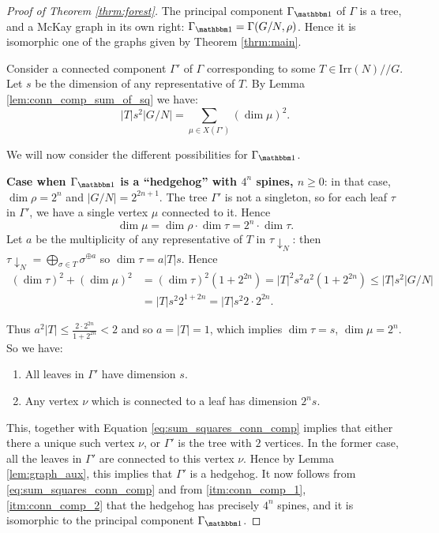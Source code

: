 \documentclass[ALCO]{cedram}
\newcommand{\triv}{{\mathbbm 1}}
\newcommand{\abs}[1]{\left|{#1}\right|}
\begin{document}
 \begin{proof}[Proof of Theorem \ref{thrm:forest}]
The principal component $\Gamma_{\triv}$ of $\Gamma$ is a tree, and a McKay graph in its own right: $\Gamma_{\triv} = \Gamma(G/N, \rho)$. Hence it is isomorphic one of the graphs given by Theorem \ref{thrm:main}. 

Consider a connected component $\Gamma'$ of $\Gamma$ corresponding to some $T\in \mathrm{Irr}(N)//G$. Let $s$ be the dimension of any representative of $T$. By Lemma \ref{lem:conn_comp_sum_of_sq} we have:
\begin{equation}\label{eq:sum_squares_conn_comp}
 |T|s^2\abs{G/N} = \sum_{\mu \in X(\Gamma')}(\dim \mu)^2.
\end{equation}
 
We will now consider the different possibilities for $\Gamma_{\triv}$.

{\bf Case when $\Gamma_{\triv}$ is a ``hedgehog'' with ${4}^n$ spines, $n\geq 0$}: in that case, $\dim \rho = 2^n$ {and $|G/N|=2^{2n+1}$. The tree $\Gamma'$ is not a singleton, so} for each leaf $\tau$ in $\Gamma'$, we have a single vertex $\mu$ connected to it. Hence $$ \dim\mu = \dim \rho \cdot \dim\tau = 2^n \cdot \dim\tau.$$ Let $a$ be the multiplicity of any representative of $T$ in $\tau \downarrow_{N}$: then $\tau \downarrow_{N} = \bigoplus_{\sigma\in T} \sigma^{\oplus a}$ so $\dim\tau = a|T|s$. Hence 
\begin{align*}
(\dim \tau)^2 + (\dim\mu)^2 &= (\dim \tau)^2 (1+2^{2n}) = |T|^2 s^2 a^2(1+2^{2n})\leq |T|s^2\abs{G/N} \\ &= |T|s^2 2^{1+2n} = |T|s^2 2\cdot 2^{2n}. 
\end{align*}
{
Thus $a^2|T| {\leq \frac{2\cdot 2^{2n}}{1+2^{2n}}} <2$ and so $a=|T|=1$, which implies $\dim\tau = s$, {$\dim \mu=2^n$}. So we have:
\begin{enumerate}[label=(\roman*)]
    \item\label{itm:conn_comp_1} All leaves in $\Gamma'$ have dimension $s$.
    \item\label{itm:conn_comp_2} {Any vertex $ \nu$ which is connected to a leaf has dimension $2^n s$.}
\end{enumerate} } 
{This, together with
Equation \eqref{eq:sum_squares_conn_comp}
implies that either there a unique such vertex $\nu$, or $\Gamma'$ is the tree with $2$ vertices. In the former case,} all the leaves in $\Gamma'$ are connected to this vertex $\nu$. Hence {by Lemma \ref{lem:graph_aux}, this implies that $\Gamma'$ is a hedgehog. It now follows from \eqref{eq:sum_squares_conn_comp} and from \ref{itm:conn_comp_1}, \ref{itm:conn_comp_2} that the hedgehog has precisely $4^n$ spines, and it is isomorphic to the principal component $\Gamma_{\triv}$.} 


\end{proof}
\end{document}
